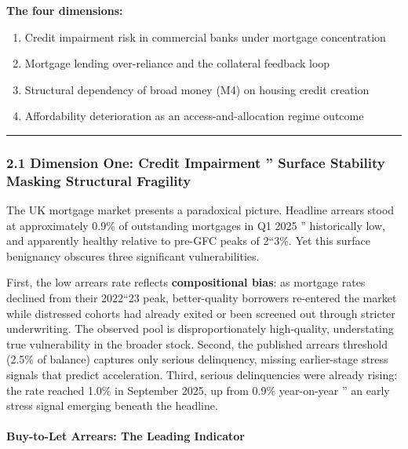 \documentclass[
]{article}
\providecommand{\tightlist}{%
  \setlength{\itemsep}{0pt}\setlength{\parskip}{0pt}}
\begin{document}
\textbf{The four dimensions:}

\begin{enumerate}
\def\labelenumi{\arabic{enumi}.}
\tightlist
\item
  Credit impairment risk in commercial banks under mortgage
  concentration
\item
  Mortgage lending over-reliance and the collateral feedback loop
\item
  Structural dependency of broad money (M4) on housing credit creation
\item
  Affordability deterioration as an access-and-allocation regime outcome
\end{enumerate}

\begin{center}\rule{0.5\linewidth}{0.5pt}\end{center}

\subsubsection{2.1 Dimension One: Credit Impairment '' Surface Stability
Masking Structural
Fragility}\label{dimension-one-credit-impairment-surface-stability-masking-structural-fragility}

The UK mortgage market presents a paradoxical picture. Headline arrears
stood at approximately 0.9\% of outstanding mortgages in Q1 2025 ''
historically low, and apparently healthy relative to pre-GFC peaks of
2``3\%. Yet this surface benignancy obscures three significant
vulnerabilities.

First, the low arrears rate reflects \textbf{compositional bias}: as
mortgage rates declined from their 2022``23 peak, better-quality
borrowers re-entered the market while distressed cohorts had already
exited or been screened out through stricter underwriting. The observed
pool is disproportionately high-quality, understating true vulnerability
in the broader stock. Second, the published arrears threshold (2.5\% of
balance) captures only serious delinquency, missing earlier-stage stress
signals that predict acceleration. Third, serious delinquencies were
already rising: the rate reached 1.0\% in September 2025, up from 0.9\%
year-on-year '' an early stress signal emerging beneath the headline.

\paragraph{Buy-to-Let Arrears: The Leading
Indicator}\label{buy-to-let-arrears-the-leading-indicator}
\end{document}
